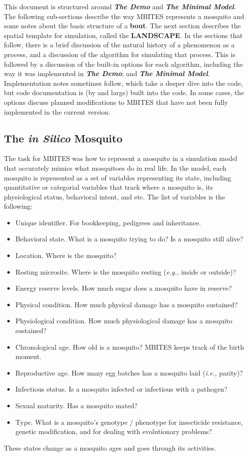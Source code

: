 \documentclass{article}
\newcommand{\eg}{{\em e.g., }}
\newcommand{\ie}{{\em i.e., }}
\newcommand{\demo}{{{\bf \em The Demo}}}
\newcommand{\minmod}{{{\bf \em The Minimal Model}}}
\begin{document}
This document is structured around \demo\; and \minmod. The following sub-sections describe the way MBITES represents a mosquito and some notes about the basic structure of a {\bf bout}. The next section describes the spatial template for simulation, called the {\bf LANDSCAPE}. In the sections that follow, there is a brief discussion of the natural history of a phenomenon as a process, and a discussion of the algorithm for simulating that process. This is followed by a discussion of the built-in options for each algorithm, including the way it was implemented in \demo; and \minmod. Implementation notes sometimes follow, which take a deeper dive into the code, but code documentation is (by and large) built into the code. In some cases, the options discuss planned modifications to MBITES that have not been fully implemented in the current version.  

\subsection{The {\em in Silico} Mosquito}

The task for MBITES was how to represent a mosquito in a simulation model that accurately mimics what mosquitoes do in real life. In the model, each mosquito is represented as a set of variables representing its state, including quantitative or categorial variables that track where a mosquito is, its physiological status, behavioral intent, and etc. The list of variables is the following: 
%
\begin{itemize}
\item Unique identifier. For bookkeeping, pedigrees and inheritance.
\item Behavioral state. What is a mosquito trying to do? Is a mosquito still alive?
\item Location. Where is the mosquito? 
\item Resting microsite. Where is the mosquito resting (\eg inside or outside)?
\item Energy reserve levels. How much sugar does a mosquito have in reserve? 
\item Physical condition. How much physical damage has a mosquito sustained? 
\item Physiological condition. How much physiological damage has a mosquito sustained?
\item Chronological age. How old is a mosquito? MBITES keeps track of the birth moment. 
\item Reproductive age. How many egg batches has a mosquito laid (\ie parity)? 
\item Infectious status. Is a mosquito infected or infectious with a pathogen? 
\item Sexual maturity. Has a mosquito mated? 
\item Type. What is a mosquito's genotype / phenotype for insecticide resistance, genetic modification, and for dealing with evolutionary problems? 
\end{itemize}
These states change as a mosquito ages and goes through its activities. 
\end{document}
